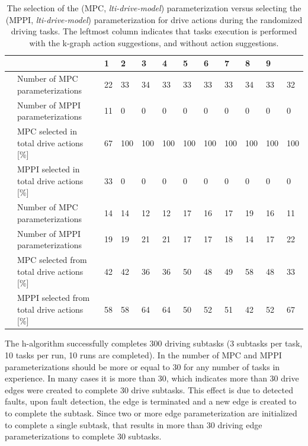 \begin{table}[H]
    \caption{The selection of the (\ac{MPC}, \textit{lti-drive-model}) parameterization versus selecting the (\ac{MPPI}, \textit{lti-drive-model}) parameterization for drive actions during the randomized driving tasks. The leftmost column indicates that tasks execution is performed with the \ac{k-graph} action suggestions, and without action suggestions.}%
    \label{table:rand_drive_mpc_vs_mppi}
    \centering
    \begin{tabular}%
      {%
        >{\raggedright\arraybackslash}p{}
        >{\raggedright\arraybackslash}p{}
      |p{0.4cm}p{0.4cm}p{0.4cm}p{0.4cm}p{0.4cm}p{0.4cm}p{0.4cm}p{0.4cm}p{0.4cm}p{0.4cm}}
      \multicolumn{2}{c|}{Number of Tasks in experience} &0&1&2&3&4&5&6&7&8&9\\\toprule
      \multirow{4}{0.1\textwidth}{With \ac{k-graph} suggestions} 
      &Number of \ac{MPC} parameterizations&22&33&34&33&33&33&33&34&33&32\\
      &Number of \ac{MPPI} parameterizations&11&0&0&0&0&0&0&0&0&0\\
      & \ac{MPC} selected in total drive actions [\%]&67&100&100&100&100&100&100&100&100&100\\
      & \ac{MPPI} selected in total drive actions [\%]&33&0&0&0&0&0&0&0&0&0\\\midrule
      \multirow{4}{0.1\textwidth}{Without \ac{k-graph} suggestions} 
      &Number of \ac{MPC} parameterizations &14&14&12&12&17&16&17&19&16&11\\
      &Number of \ac{MPPI} parameterizations &19&19&21&21&17&17&18&14&17&22\\
      & \ac{MPC} selected from total drive actions [\%] &42&42&36&36&50&48&49&58&48&33\\
      & \ac{MPPI} selected from total drive actions [\%]&58&58&64&64&50&52&51&42&52&67\\
    \end{tabular}
\end{table}

The \ac{h-algorithm} successfully completes 300 driving subtasks (3 subtasks per task, 10 tasks per run, 10 runs are completed). In  the number of \ac{MPC} and \ac{MPPI} parameterizations should be more or equal to 30 for any number of tasks in experience. In many cases it is more than 30, which indicates more than 30 drive edges were created to complete 30 drive subtasks. This effect is due to detected faults, upon fault detection, the edge is terminated and a new edge is created to to complete the subtask. Since two or more edge parameterization are initialized to complete a single subtask, that results in more than 30 driving edge parameterizations to complete 30 subtasks.\bs

